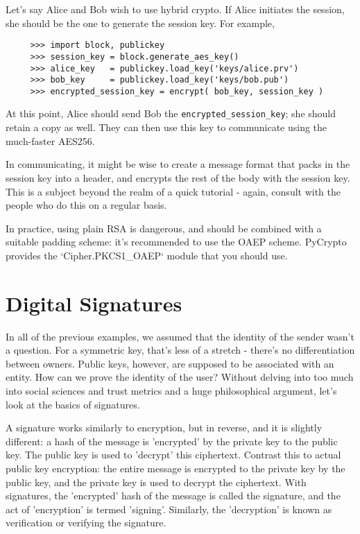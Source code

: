 \documentclass[letterpaper,10pt]{article}
\begin{document}
Let's say Alice and Bob wish to use hybrid crypto. If Alice initiates the 
session, she should be the one to generate the session key. For example,
\begin{verbatim}
     >>> import block, publickey
     >>> session_key = block.generate_aes_key()
     >>> alice_key   = publickey.load_key('keys/alice.prv')
     >>> bob_key     = publickey.load_key('keys/bob.pub')
     >>> encrypted_session_key = encrypt( bob_key, session_key )
\end{verbatim}

At this point, Alice should send Bob the \verb|encrypted_session_key|; she 
should retain a copy as well. They can then use this key to communicate using
the much-faster AES256.

In communicating, it might be wise to create a message format that packs in 
the session key into a header, and encrypts the rest of the body with the
session key. This is a subject beyond the realm of a quick tutorial - again,
consult with the people who do this on a regular basis.

In practice, using plain RSA is dangerous, and should be combined with a
suitable padding scheme: it's recommended to use the OAEP scheme. PyCrypto
provides the `Cipher.PKCS1_OAEP` module that you should use.

\section{Digital Signatures}
In all of the previous examples, we assumed that the identity of the sender
wasn't a question. For a symmetric key, that's less of a stretch - there's no 
differentiation between owners. Public keys, however, are supposed to be
associated with an entity. How can we prove the identity of the user? Without
delving into too much into social sciences and trust metrics and a huge
philosophical argument, let's look at the basics of signatures. 

A signature works similarly to encryption, but in reverse, and it is slightly
different: a hash of the message is 'encrypted' by the private key to the 
public key. The public key is used to 'decrypt' this ciphertext. Contrast this 
to actual public key encryption: the entire message is encrypted to the private 
key by the public key, and the private key is used to decrypt the ciphertext. 
With signatures, the 'encrypted' hash of the message is called the signature,
and the act of 'encryption' is termed 'signing'. Similarly, the 'decryption' 
is known as verification or verifying the signature.
\end{document}
